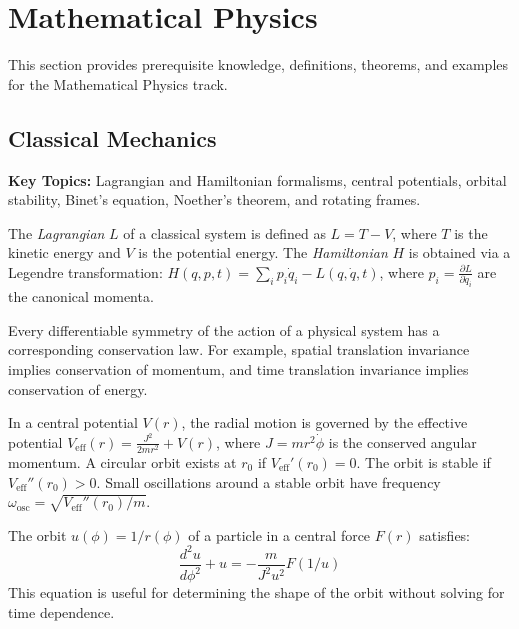 \chapter{Mathematical Physics}
\label{sec:prereq-physics}

This section provides prerequisite knowledge, definitions, theorems, and examples for the Mathematical Physics track.

\section{Classical Mechanics}

\textbf{Key Topics:} Lagrangian and Hamiltonian formalisms, central potentials, orbital stability, Binet's equation, Noether's theorem, and rotating frames.

\begin{definition}
The \emph{Lagrangian} $L$ of a classical system is defined as $L = T - V$, where $T$ is the kinetic energy and $V$ is the potential energy. The \emph{Hamiltonian} $H$ is obtained via a Legendre transformation: $H(q, p, t) = \sum_i p_i \dot{q}_i - L(q, \dot{q}, t)$, where $p_i = \frac{\partial L}{\partial \dot{q}_i}$ are the canonical momenta.
\end{definition}

\begin{theorem}
Every differentiable symmetry of the action of a physical system has a corresponding conservation law. For example, spatial translation invariance implies conservation of momentum, and time translation invariance implies conservation of energy.
\end{theorem}

\begin{definition}
In a central potential $V(r)$, the radial motion is governed by the effective potential $V_{\text{eff}}(r) = \frac{J^2}{2mr^2} + V(r)$, where $J = mr^2\dot{\phi}$ is the conserved angular momentum. A circular orbit exists at $r_0$ if $V_{\text{eff}}'(r_0) = 0$. The orbit is stable if $V_{\text{eff}}''(r_0) > 0$. Small oscillations around a stable orbit have frequency $\omega_{\text{osc}} = \sqrt{V_{\text{eff}}''(r_0)/m}$.
\end{definition}

\begin{definition}
The orbit $u(\phi) = 1/r(\phi)$ of a particle in a central force $F(r)$ satisfies:
\[ \frac{d^2u}{d\phi^2} + u = -\frac{m}{J^2 u^2} F(1/u) \]
This equation is useful for determining the shape of the orbit without solving for time dependence.
\end{definition}

